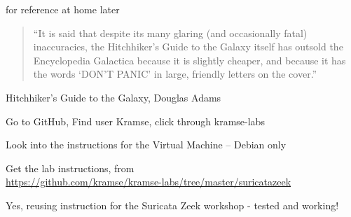 \documentclass[Screen16to9,17pt]{foils}
\begin{document}
for reference at home later




\begin{quote}
“It is said that despite its many glaring (and occasionally fatal) inaccuracies, the Hitchhiker’s Guide to the Galaxy itself has outsold the Encyclopedia Galactica because it is slightly cheaper, and because it has the words ‘DON’T PANIC’ in large, friendly letters on the cover.”
\end{quote}
Hitchhiker’s Guide to the Galaxy, Douglas Adams


\begin{list2}
\item Go to GitHub, Find user Kramse, click through kramse-labs
\item Look into the instructions for the Virtual Machine -- Debian only

\item Get the lab instructions, from\\ {\footnotesize\url{https://github.com/kramse/kramse-labs/tree/master/suricatazeek}}
\end{list2}

Yes, reusing instruction for the Suricata Zeek workshop - tested and working!





\end{document}
